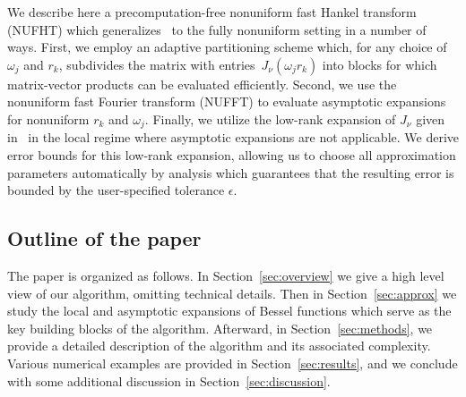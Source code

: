 We describe here a precomputation-free nonuniform fast Hankel transform (NUFHT)
which generalizes~\cite{townsend2015fast} to the fully nonuniform setting in a
number of ways. First, we employ an adaptive partitioning scheme which, for any
choice of $\omega_j$ and $r_k$, subdivides the matrix with
entries~$J_\nu(\omega_j r_k)$ into blocks for which matrix-vector products can
be evaluated efficiently. Second, we use the nonuniform fast Fourier transform
(NUFFT) to evaluate asymptotic expansions for nonuniform $r_k$ and $\omega_j$.
Finally, we utilize the low-rank expansion of $J_\nu$ given
in~\cite{wimp1962polynomial} in the local regime where asymptotic expansions are
not applicable. We derive error bounds for this low-rank expansion, allowing us
to choose all approximation parameters automatically by analysis which
guarantees that the resulting error is bounded by the user-specified tolerance
$\epsilon$.

\subsection*{Outline of the paper}

The paper is organized as follows. In Section~\ref{sec:overview} we give a high
level view of our algorithm, omitting technical details. Then in
Section~\ref{sec:approx} we study the local and asymptotic expansions of Bessel
functions which serve as the key building blocks of the algorithm. Afterward, in
Section~\ref{sec:methods}, we provide a detailed description of the algorithm
and its associated complexity. Various numerical examples are provided in
Section~\ref{sec:results}, and we conclude with some additional discussion in
Section~\ref{sec:discussion}.




